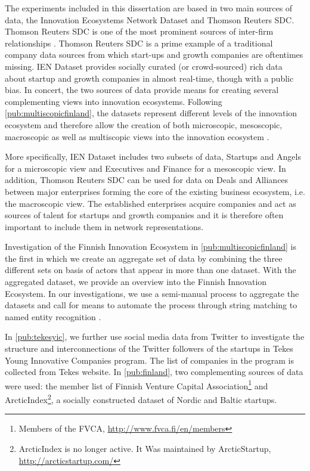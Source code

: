 The experiments included in this dissertation are based in two main sources of data, the Innovation Ecosystems Network Dataset \citep{Rubens2010LeveragingMoves} and Thomson Reuters SDC. Thomson Reuters SDC is one of the most prominent sources of inter-firm relationships \citep{Schilling2008}. Thomson Reuters SDC is a prime example of a traditional company data sources from which start-ups and growth companies are oftentimes missing. IEN Dataset provides socially curated (or crowd-sourced) rich data about startup and growth companies in almost real-time, though with a public bias. In concert, the two sources of data provide means for creating several complementing views into innovation ecosystems. Following \ref{pub:multiscopicfinland}, the datasets represent different levels of the innovation ecosystem and therefore allow the creation of both microscopic, mesoscopic, macroscopic as well as multiscopic views into the innovation ecosystem \citep{Still2013NetworksFinland}.

More specifically, IEN Dataset includes two subsets of data, Startups and Angels for a microscopic view and Executives and Finance for a mesoscopic view. In addition, Thomson Reuters SDC can be used for data on Deals and Alliances between major enterprises forming the core of the existing business ecosystem, i.e. the macroscopic view. The established enterprises acquire companies and act as sources of talent for startups and growth companies and it is therefore often important to include them in network representations.

Investigation of the Finnish Innovation Ecosystem in \ref{pub:multiscopicfinland} is the first in which we create an aggregate set of data by combining the three different sets on basis of actors that appear in more than one dataset. With the aggregated dataset, we provide an overview into the Finnish Innovation Ecosystem. In our investigations, we use a semi-manual process to aggregate the datasets and call for means to automate the process through string matching \citep{Navarro2001AMatching} to named entity recognition \citep{Finkel2005IncorporatingSampling}.

In \ref{pub:tekesyic}, we further use social media data from Twitter to investigate the structure and interconnections of the Twitter followers of the startups in Tekes Young Innovative Companies program. The list of companies in the program is collected from Tekes website. In \ref{pub:finland}, two complementing sources of data were used: the member list of Finnish Venture Capital Association\footnote{Members of the FVCA, \url{http://www.fvca.fi/en/members}} and ArcticIndex\footnote{ArcticIndex is no longer active. It Was maintained by ArcticStartup, \url{http://arcticstartup.com/}}, a socially constructed dataset of Nordic and Baltic startups.

